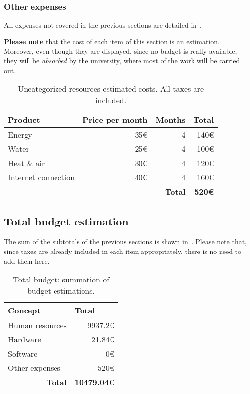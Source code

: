 \subsubsection{Other expenses}

All expenses not covered in the previous sections are detailed in~.

\textbf{Please note} that the cost of each item of this section is an estimation. Moreover, even though they are displayed, since no budget is really available, they will be \textit{absorbed} by the university, where most of the work will be carried out.

\begin{table}[h]
	\centering
	\begin{tabular}{lrrr}
		\hline
		\textbf{Product} & \multicolumn{1}{l}{\textbf{Price per month}} & \multicolumn{1}{l}{\textbf{Months}} & \multicolumn{1}{l}{\textbf{Total}} \\ \hline
		Energy & 35€ & 4 & 140€ \\
		Water & 25€ & 4 & 100€ \\
		Heat \& air & 30€ & 4 & 120€ \\
		Internet connection & 40€ & 4 & 160€ \\ \hline
		& \multicolumn{1}{l}{} & \textbf{Total} & \textbf{520€}
	\end{tabular}
	\caption{Uncategorized resources estimated costs. All taxes are included.}
	\label{table:other-resources}
\end{table}

\subsection{Total budget estimation}
\label{Management:Budget:Estimation}

The sum of the subtotals of the previous sections is shown in~. Please note that, since taxes are already included in each item appropriately, there is no need to add them here.

\begin{table}[h]
	\centering
	\begin{tabular}{lr}
		\hline
		\textbf{Concept} & \multicolumn{1}{l}{\textbf{Total}} \\ \hline
		Human resources & 9937.2€ \\
		Hardware & 21.84€ \\
		Software & 0€ \\
		Other expenses & 520€ \\ \hline
		\multicolumn{1}{r}{\textbf{Total}} & \multicolumn{1}{l}{\textbf{10479.04€}}
	\end{tabular}
	\caption{Total budget: summation of budget estimations.}
	\label{table:total-resources}
\end{table}

